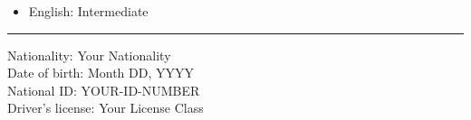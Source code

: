 \documentclass[11pt, a4paper]{article}
\begin{document}
\vspace{2pt}

\begin{itemize}[leftmargin=1.5em, itemsep=1pt, topsep=2pt]
  \item English: Intermediate
\end{itemize}


\vspace{6pt}\vspace{2pt}\hrule\vspace{4pt}

\noindent Nationality: Your Nationality\\
\noindent Date of birth: Month DD, YYYY\\
\noindent National ID: YOUR-ID-NUMBER\\
\noindent Driver's license: Your License Class
\end{document}
